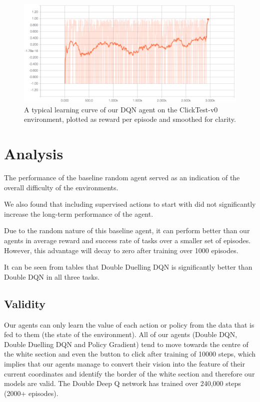 \documentclass[10pt,journal,compsoc]{IEEEtran}
\begin{document}
\begin{figure}[h!]
\centering
	\includegraphics[width=\columnwidth, keepaspectratio]{learningcurve.png}
	\caption{A typical learning curve of our DQN agent on the ClickTest-v0 environment, plotted as reward per episode and smoothed for clarity.}
	\label{fig:tboard}
\end{figure}




\section{Analysis}
The performance of the baseline random agent served as an indication of the overall difficulty of the environments.

We also found that including supervised actions to start with did not significantly increase the long-term performance of the agent.

Due to the random nature of this baseline agent, it can perform better than our agents in average reward and success rate of tasks over a smaller set of episodes. However, this advantage will decay to zero after training over 1000 episodes.

It can be seen from tables that Double Duelling DQN is significantly better than Double DQN in all three tasks.
 
\subsection{Validity}
Our agents can only learn the value of each action or policy from the data that is fed to them (the state of the environment). All of our agents (Double DQN, Double Duelling DQN and Policy Gradient) tend to move towards the centre of the white section and even the button to click after training of 10000 steps, which implies that our agents manage to convert their vision into the feature of their current coordinates and identify the border of the white section and therefore our models are valid.
The Double Deep Q network has trained over 240,000 steps (2000+ episodes).
\end{document}
